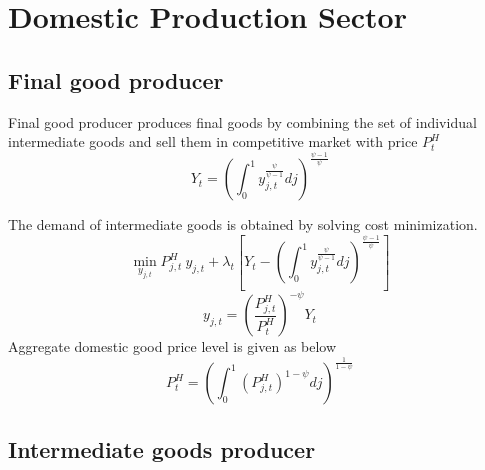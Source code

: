 \documentclass[11pt, a4paper]{article}
\begin{document}
\section{Domestic Production Sector}
\subsection{Final good producer}

 Final good producer produces final goods by combining the set of individual intermediate goods and sell them in competitive market with price $P_t^H$
 \begin{displaymath}  Y_t = \left(\int_{0}^{1}   y_{j,t}^{\frac{\psi}{\psi-1}} dj\right)^{\frac{\psi-1}{\psi}} \end{displaymath}

 
 The demand of intermediate goods is obtained by solving cost minimization. 
  \begin{displaymath}
  \min_{y_{j,t}} P_{j,t}^H~ y_{j,t} + \lambda_t \left[ Y_t - \left(\int_{0}^{1}   y_{j,t}^{\frac{\psi}{\psi-1}} dj\right)^{\frac{\psi-1}{\psi}}   \right]  \end{displaymath}
  \begin{displaymath}
  y_{j,t} =  \left(\frac{P_{j,t}^H}{P_t^H} \right)^{-\psi} Y_t 
 \end{displaymath}
Aggregate domestic good price level is given as below
  \begin{displaymath}
  P_{t}^H =  \left(\int_0^1 (P_{j,t}^H)^{1-\psi} dj \right)^{\frac{1}{1-\psi}} 
 \end{displaymath}

 
 \subsection{Intermediate goods producer}
\end{document}
